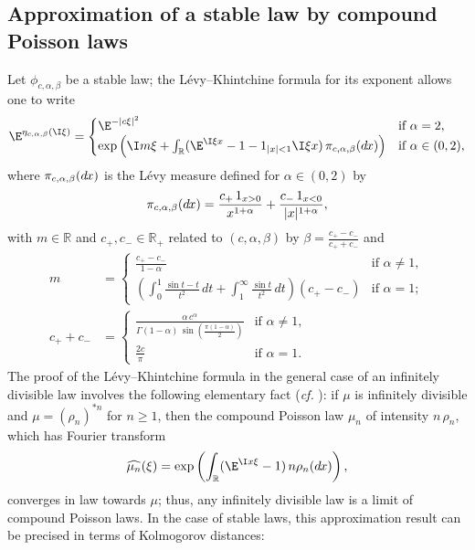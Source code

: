 \documentclass[envcountsame]{svmult}
\newcommand{\R}{\mathbb{R}}
\newcommand{\DD}[1]{\,d\hspace*{-0.3mm}{#1}}
\begin{document}
\subsection{Approximation of a stable law by compound Poisson laws}\label{subsec:compoundpoisson}
Let $\phi_{c,\alpha,\beta}$ be a stable law; the Lévy--Khintchine formula for its exponent allows one to write
$$\E^{\eta_{c,\alpha,\beta}(\I\xi)} = \begin{cases}
	\E^{-|c\xi|^2} &\text{if }\alpha=2,\\
	\exp\left(\I m\xi+\int_{\R}(\E^{\I \xi x}-1-1_{|x|<1}\I\xi x)\,\pi_{c,\alpha,\beta}(\!\DD{x})\right)& \text{if }\alpha\in(0,2),
\end{cases}$$
where $\pi_{c,\alpha,\beta}(\!\DD{x})$ is the Lévy measure defined for $\alpha \in (0,2)$ by
$$\pi_{c,\alpha,\beta}(\!\DD{x}) = \frac{c_+\,1_{x>0}}{x^{1+\alpha}} +\frac{c_-\,1_{x<0}}{|x|^{1+\alpha}} ,$$
with $m \in \R$ and $c_+,c_-\in \R_+$  related to $(c,\alpha,\beta)$ by $\beta = \frac{c_+-c_-}{c_++c_-} $ and
\begin{align*}
m&=\begin{cases}
	\frac{c_+-c_-}{1-\alpha} &\text{if }\alpha \neq 1,\\
	\left(\int_0^1 \frac{\sin t - t}{t^2}\,dt+\int_1^\infty \frac{\sin t}{t^2}\,dt\right)(c_+-c_-)&\text{if } \alpha = 1;
\end{cases} \\
c_++c_- &= \begin{cases}
	\frac{\alpha\,c^\alpha}{\Gamma(1-\alpha)\,\sin\left(\frac{\pi(1-\alpha)}{2}\right)}  &\text{if }\alpha \neq 1,\\
	\frac{2c}{\pi}&\text{if }\alpha=1.
\end{cases}
\end{align*}
The proof of the Lévy--Khintchine formula in the general case of an infinitely divisible law involves the following elementary fact (\emph{cf.} \cite[Chapter 2]{Sato99}): if $\mu$ is infinitely divisible and $\mu = (\rho_n)^{*n}$ for $n \geq 1$, then the compound Poisson law $\mu_n$ of intensity $n\,\rho_n$, which has Fourier transform
$$\widehat{\mu_n}(\xi) = \exp\left(\int_{\R} (\E^{\I x\xi}-1)\,n\rho_n(\!\DD{x})\right),$$
converges in law towards $\mu$; thus, any infinitely divisible law is a limit of compound Poisson laws. In the case of stable laws, this approximation result can be precised in terms of Kolmogorov distances:
\end{document}
